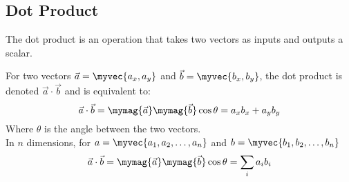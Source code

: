 \documentclass[11pt]{article}
\newenvironment{mybox}
{\begin{tcolorbox}[colback=red!5!white,colframe=red!75!black]}
{\end{tcolorbox}}
\begin{document}
\subsection{Dot Product}
The dot product is an operation that takes two vectors as inputs and outputs a scalar.
\begin{mybox}
    For two vectors $\vec{a}=\myvec{a_x,a_y}$ and $\vec{b}=\myvec{b_x,b_y}$, the dot product is denoted $\vec{a} \cdot \vec{b}$ and is equivalent to:
    \begin{equation*}
        \vec{a} \cdot \vec{b} = \mymag{\vec{a}}\mymag{\vec{b}}\cos{\theta} = a_x b_x+a_y b_y
    \end{equation*}
    Where $\theta$ is the angle between the two vectors.\\
    In $n$ dimensions, for $a = \myvec{a_1,a_2,\ldots,a_n}$ and $b = \myvec{b_1,b_2,\ldots,b_n}$
    \begin{equation*}
    \vec{a} \cdot \vec{b} = \mymag{\vec{a}}\mymag{\vec{b}}\cos{\theta} = \sum_i a_i b_i
    \end{equation*}
\end{mybox}
\end{document}
